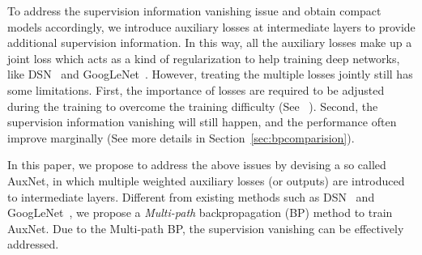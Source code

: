 \documentclass[10pt,onecolumn,letterpaper]{article}
\def\SexyName{AuxNet\xspace}
\begin{document}
To address the supervision information vanishing issue and obtain compact models accordingly, we introduce auxiliary losses at intermediate layers to provide additional supervision information. In this way, all the auxiliary losses make up a joint loss which acts as a kind of regularization to help training deep networks, like DSN~\cite{Lee2015} and GoogLeNet~\cite{szegedy2015going}. However, treating the multiple losses jointly still has some limitations. First, the importance of losses are required to be adjusted during the training to overcome the training difficulty (See ~\cite{Lee2015}).  Second, the supervision information vanishing will still happen, and the performance often improve marginally  (See more details in Section~\ref{sec:bpcomparision}).




In this paper, we propose to address the above issues by devising a so called \SexyName, in which multiple weighted auxiliary losses (or outputs) are introduced to intermediate layers.  Different from existing methods such as  DSN~\cite{Lee2015} and GoogLeNet~\cite{szegedy2015going}, we propose a \emph{{Multi-path}} backpropagation (BP) method to train \SexyName.
Due to the Multi-path BP, the supervision vanishing can be effectively addressed.
\end{document}
